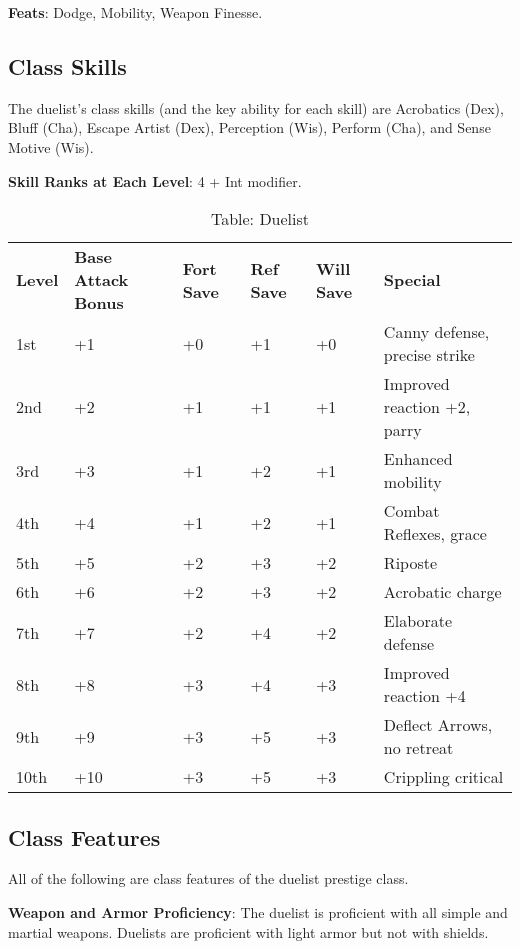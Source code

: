 \textbf{Feats}: Dodge, Mobility, Weapon Finesse.
				
\subsection{Class Skills}

				
The duelist's class skills (and the key ability for each skill) are Acrobatics (Dex), Bluff (Cha), Escape Artist (Dex), Perception (Wis), Perform (Cha), and Sense Motive (Wis).
				
\textbf{ Skill Ranks at Each Level}: 4 + Int modifier.


\begin{table}[]
\sffamily
\caption{Table: Duelist}
\begin{tabular}{llllll}
\textbf{Level} &\textbf{Base Attack Bonus} & \textbf{Fort Save} & \textbf{Ref Save} & \textbf{Will Save} & \textbf{Special}\\
1st & +1 & +0 & +1 & +0 & Canny defense, precise strike\\
2nd & +2 & +1 & +1 & +1 & Improved reaction +2, parry\\
3rd & +3 & +1 & +2 & +1 & Enhanced mobility\\
4th & +4 & +1 & +2 & +1 & Combat Reflexes, grace\\
5th & +5 & +2 & +3 & +2 & Riposte\\
6th & +6 & +2 & +3 & +2 & Acrobatic charge\\
7th & +7 & +2 & +4 & +2 & Elaborate defense\\
8th & +8 & +3 & +4 & +3 & Improved reaction +4\\
9th & +9 & +3 & +5 & +3 & Deflect Arrows, no retreat\\
10th & +10 & +3 & +5 & +3 & Crippling critical\\
\end{tabular}
\end{table}
				
\subsection{Class Features}

				
All of the following are class features of the duelist prestige class.
				
\textbf{Weapon and Armor Proficiency}: The duelist is proficient with all simple and martial weapons. Duelists are proficient with light armor but not with shields.
				
